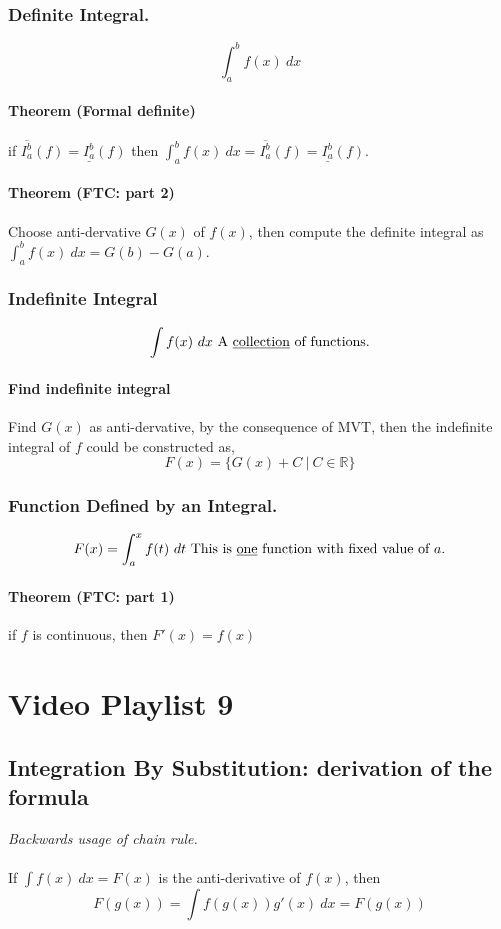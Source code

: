 \documentclass{article}
\begin{document}
	\subsubsection{Definite Integral.}
	\[
	\int_a^b{f(x)\ dx}
	\]
	\paragraph{Theorem (Formal definite)} if $\overline{I_a^b}(f) = \underline{I_a^b}(f)$ then $\int_a^b{f(x)\ dx} = \overline{I_a^b}(f) = \underline{I_a^b}(f)$.
	\paragraph{Theorem (FTC: part 2)} Choose  anti-dervative $G(x)$ of $f(x)$, then compute the definite integral as $\int_a^b{f(x)\ dx} = G(b) - G(a)$.
	\subsubsection{Indefinite Integral}
	\[
	\int{f(x)\ dx}\ \text{A \underbar{collection} of functions.}
	\]
	\paragraph{Find indefinite integral} Find $G(x)$ as  anti-dervative, by the consequence of MVT, then the indefinite integral of $f$ could be constructed as, 
	\[
	F(x) = \{G(x) + C \ \vert\ C \in \mathbb{R} \}
	\]
	\subsubsection{Function Defined by an Integral.}
	\[
	F(x) = \int_a^x{f(t)\ dt} \ \text{This is \underbar{one} function with fixed value of $a$.}
	\]
	\paragraph{Theorem (FTC: part 1)} if $f$ is continuous, then $F'(x) = f(x)$
	
	\section{Video Playlist 9}
	\subsection{Integration By Substitution: derivation of the formula}
	\emph{Backwards usage of chain rule.}
	\paragraph{} If $\int{f(x)\ dx} = F(x)$ is the anti-derivative of $f(x)$, then
	\[
	F(g(x)) = \int{f(g(x))g'(x)\ dx} = F(g(x))
	\]
\end{document}
